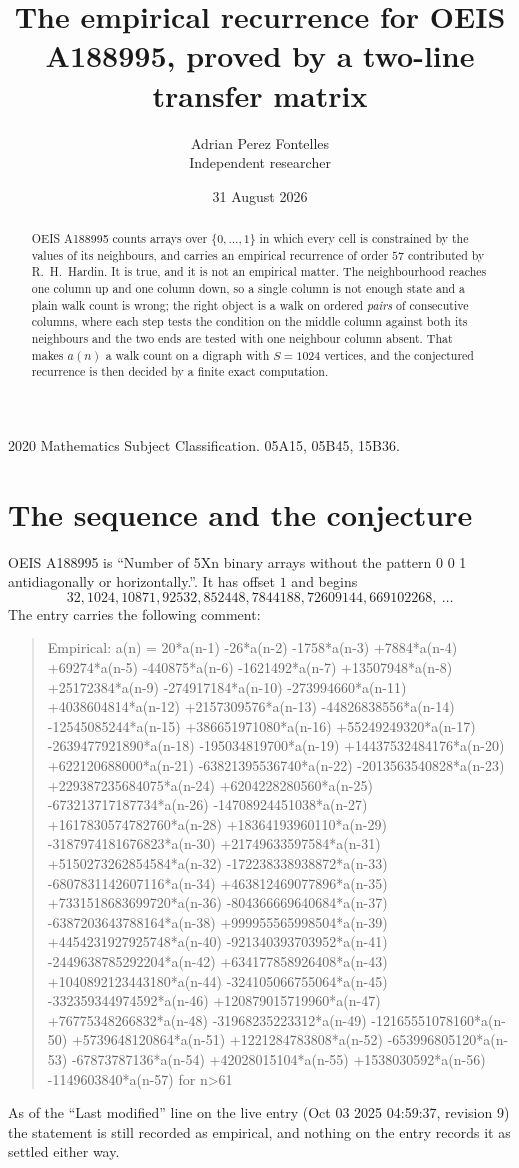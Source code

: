 \documentclass[11pt,a4paper]{article}
\title{The empirical recurrence for OEIS A188995, proved by a two-line transfer matrix}
\author{Adrian Perez Fontelles\\ \small Independent researcher}
\date{31 August 2026}
\theoremstyle{plain}
\theoremstyle{definition}
\begin{document}
\maketitle

\begin{abstract}
OEIS A188995 counts arrays over $\{0,\dots,1\}$ in which every cell is constrained by the
values of its neighbours, and carries an empirical recurrence of order $57$ contributed
by R.~H.~Hardin. It is true, and it is not an empirical matter. The neighbourhood reaches one
column up and one column down, so a single column is not enough state and a plain walk count
is wrong; the right object is a walk on ordered \emph{pairs} of consecutive columns, where
each step tests the condition on the middle column against both its neighbours and the two
ends are tested with one neighbour column absent. That makes $a(n)$ a walk count on a digraph
with $S=1024$ vertices, and the conjectured recurrence is then decided by a finite exact
computation.
\end{abstract}

\noindent\small 2020 Mathematics Subject Classification. 05A15, 05B45, 15B36.\normalsize

\section{The sequence and the conjecture}

OEIS A188995 is ``Number of 5Xn binary arrays without the pattern 0 0 1 antidiagonally or horizontally.''. It has offset $1$ and begins
\[
32, 1024, 10871, 92532, 852448, 7844188, 72609144, 669102268,\ \dots
\]
The entry carries the following comment:
\begin{quote}\small
Empirical: a(n) = 20*a(n-1) -26*a(n-2) -1758*a(n-3) +7884*a(n-4) +69274*a(n-5) -440875*a(n-6) -1621492*a(n-7) +13507948*a(n-8) +25172384*a(n-9) -274917184*a(n-10) -273994660*a(n-11) +4038604814*a(n-12) +2157309576*a(n-13) -44826838556*a(n-14) -12545085244*a(n-15) +386651971080*a(n-16) +55249249320*a(n-17) -2639477921890*a(n-18) -195034819700*a(n-19) +14437532484176*a(n-20) +622120688000*a(n-21) -63821395536740*a(n-22) -2013563540828*a(n-23) +229387235684075*a(n-24) +6204228280560*a(n-25) -673213717187734*a(n-26) -14708924451038*a(n-27) +1617830574782760*a(n-28) +18364193960110*a(n-29) -3187974181676823*a(n-30) +21749633597584*a(n-31) +5150273262854584*a(n-32) -172238338938872*a(n-33) -6807831142607116*a(n-34) +463812469077896*a(n-35) +7331518683699720*a(n-36) -804366669640684*a(n-37) -6387203643788164*a(n-38) +999955565998504*a(n-39) +4454231927925748*a(n-40) -921340393703952*a(n-41) -2449638785292204*a(n-42) +634177858926408*a(n-43) +1040892123443180*a(n-44) -324105066755064*a(n-45) -332359344974592*a(n-46) +120879015719960*a(n-47) +76775348266832*a(n-48) -31968235223312*a(n-49) -12165551078160*a(n-50) +5739648120864*a(n-51) +1221284783808*a(n-52) -653996805120*a(n-53) -67873787136*a(n-54) +42028015104*a(n-55) +1538030592*a(n-56) -1149603840*a(n-57) for n>61
\end{quote}
As of the ``Last modified'' line on the live entry (Oct 03 2025 04:59:37, revision 9) the statement is
still recorded as empirical, and nothing on the entry records it as settled either way.
\end{document}
